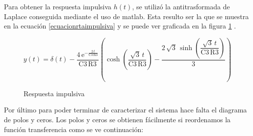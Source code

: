 \documentclass[12pt,a4paper]{article}
\begin{document}
Para obtener la respuesta impulsiva $h(t)$, se utilizó la antitrasformada de Laplace conseguida mediante el uso de matlab. Esta resulto ser la que se muestra en la ecuación \ref{ecuacionrtaimpulsiva} y se puede ver graficada en la figura \ref{respuestaimpulsiva} .

\begin{equation}
y \! \left(t\right) = \delta \! \left(t\right) - \dfrac{4\, \mathrm{e}^{-\frac{2\, t}{\mathrm{C3}\, \mathrm{R3}}}} {\mathrm{C3}\, \mathrm{R3}} \left(\cosh\!\left(\dfrac{\sqrt{3}\, t}{\mathrm{C3}\, \mathrm{R3}}\right) - \dfrac{2\, \sqrt{3}\, \sinh\!\left(\dfrac{\sqrt{3}\, t}{\mathrm{C3}\, \mathrm{R3}}\right)}{3}\right)
\label{ecuacionrtaimpulsiva}
\end{equation}

\begin{figure}[H] 
\begin{center}
\caption{Respuesta impulsiva}
\label{respuestaimpulsiva}
\end{center}
\end{figure}





Por último para poder terminar de caracterizar el sistema hace falta el diagrama de polos y ceros. Los polos y ceros se obtienen fácilmente si reordenamos la función transferencia como se ve continuación:
\end{document}
